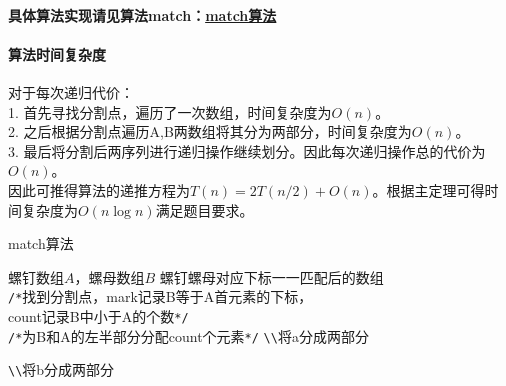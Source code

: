 \documentclass[11pt]{ctexart}
\begin{document}
	\paragraph{具体算法实现请见算法match：\hyperref[match算法]{match算法}}
	\paragraph{算法时间复杂度}对于每次递归代价：\\
	\hspace*{20pt}1. 首先寻找分割点，遍历了一次数组，时间复杂度为$O(n)$。\\
	\hspace*{20pt}2. 之后根据分割点遍历A,B两数组将其分为两部分，时间复杂度为$O(n)$。\\
	\hspace*{20pt}3. 最后将分割后两序列进行递归操作继续划分。因此每次递归操作总的代价为$O(n)$。\\
	\hspace*{20pt}因此可推得算法的递推方程为$T(n)=2T(n/2)+O(n)$。根据主定理可得时间复杂度为$O(n\log n)$满足题目要求。
	\begin{algorithm}
		\caption{match算法}
		\label{match算法}
		\begin{algorithmic}[1]
			\Require 螺钉数组$A$，螺母数组$B$
			\Ensure 螺钉螺母对应下标一一匹配后的数组
			\\
			\verb|/*|找到分割点，mark记录B等于A首元素的下标，\\
			count记录B中小于A的个数\verb|*/|
			\EndFor\\
			\verb|/*|为B和A的左半部分分配count个元素\verb|*/|
			\verb|\\|将a分成两部分
			\EndWhile
			\EndWhile
			\EndWhile
			
			\verb|\\|将b分成两部分
			\EndWhile
			\EndWhile
			\EndWhile
			\EndFunction
		\end{algorithmic}
	\end{algorithm}
	\newpage
\end{document}
